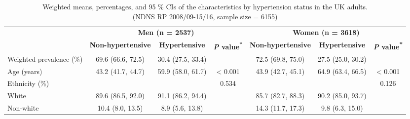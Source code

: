 \begin{table}
	\caption{\label{tab:tab1hypetension}Weighted means, percentages, and 95 \% CIs of the characteristics by hypertension status in the UK adults. \\(NDNS RP 2008/09-15/16, sample size = 6155)}
	\centering
	\fontsize{9}{11}\selectfont
	\begin{tabular}[t]{lcccccc}
		\hiderowcolors
		\toprule
		\multicolumn{1}{c}{ } & \multicolumn{3}{c}{\textbf{Men (n = 2537)}} & \multicolumn{3}{c}{\textbf{Women (n = 3618)}} \\
		\cmidrule(l{2pt}r{2pt}){2-4} \cmidrule(l{2pt}r{2pt}){5-7}
		& \textbf{Non-hypertensive} & \textbf{Hypertensive} & \textbf{\textit{P} value\textsuperscript{*}} & \textbf{Non-hypertensive} & \textbf{Hypertensive} & \textbf{\textit{P} value\textsuperscript{*}}\\
		\midrule
		\showrowcolors
		Weighted prevalence (\%) & 69.6 (66.6, 72.5)  & 30.4 (27.5, 33.4) &  & 72.5 (69.8, 75.0) & 27.5 (25.0, 30.2) & \\
		Age (years) & 43.2 (41.7, 44.7) & 59.9 (58.0, 61.7) & < 0.001 & 43.9 (42.7, 45.1) & 64.9 (63.4, 66.5) & < 0.001\\
		Ethnicity (\%) &  &  & 0.534 &  &  & 0.126\\
		\hspace{1em}White & 89.6 (86.5, 92.0) & 91.1 (86.2, 94.4) &  & 85.7 (82.7, 88.3) & 90.2 (85.0, 93.7) & \\
		\hspace{1em}Non-white & 10.4 (8.0, 13.5) & 8.9 (5.6, 13.8) &  & 14.3 (11.7, 17.3) & 9.8 (6.3, 15.0) & \\

\end{tabular}
\end{table}
